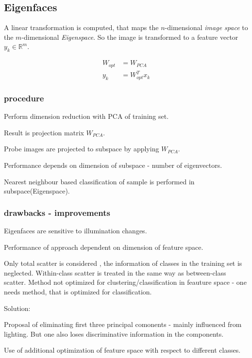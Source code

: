   \subsection{Eigenfaces}
    A linear transformation is computed, that maps the $n$-dimensional \textit{image space} to
    the $m$-dimensional \textit{Eigenspace}.
    So the image is transformed to a feature vector $y_k  \in \mathbb{R}^m$.

    \begin{align}
      W_{opt}& =W_{PCA}\\
      y_k    & =W_{opt}^T x_k 
    \end{align}

    \subsubsection{procedure}
    Perform dimension reduction with PCA of training set.

    Result is projection matrix $W_{PCA}$.

    Probe images are projected to subspace by applying $W_{PCA}$.

    Performance depends on dimension of subspace - number of eigenvectors.

    Nearest neighbour based classification of sample is performed in subspace(Eigenspace).

    \subsubsection{drawbacks - improvements}
    Eigenfaces are sensitive to illumination changes.

    Performance of approach dependent on dimension of feature space.

    Only total scatter is considered , the information of classes in the training set is
    neglected. Within-class scatter is treated in the same way as between-class scatter.
    Method not optimized for clustering/classification in feauture space - one needs
    method, that is optimized for classification.


    Solution:

    Proposal of eliminating first three principal comonents - mainly influenced from lighting.
    But one also loses discriminative information in the components.

    Use of additional optimization of feature space with respect to different classes.

